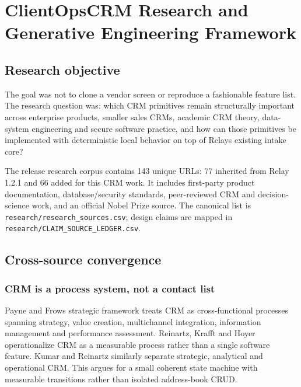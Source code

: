 \documentclass[
]{article}
\author{}
\date{}
\begin{document}
\section{ClientOpsCRM Research and Generative Engineering
Framework}\label{clientopscrm-research-and-generative-engineering-framework}

\subsection{Research objective}\label{research-objective}

The goal was not to clone a vendor screen or reproduce a fashionable
feature list. The research question was: which CRM primitives remain
structurally important across enterprise products, smaller sales CRMs,
academic CRM theory, data-system engineering and secure software
practice, and how can those primitives be implemented with deterministic
local behavior on top of Relay\textquotesingle s existing intake core?

The release research corpus contains 143 unique URLs: 77 inherited from
Relay 1.2.1 and 66 added for this CRM work. It includes first-party
product documentation, database/security standards, peer-reviewed CRM
and decision-science work, and an official Nobel Prize source. The
canonical list is \texttt{research/research\_sources.csv}; design claims
are mapped in \texttt{research/CLAIM\_SOURCE\_LEDGER.csv}.

\subsection{Cross-source convergence}\label{cross-source-convergence}

\subsubsection{CRM is a process system, not a contact
list}\label{crm-is-a-process-system-not-a-contact-list}

Payne and Frow\textquotesingle s strategic framework treats CRM as
cross-functional processes spanning strategy, value creation,
multichannel integration, information management and performance
assessment. Reinartz, Krafft and Hoyer operationalize CRM as a
measurable process rather than a single software feature. Kumar and
Reinartz similarly separate strategic, analytical and operational CRM.
This argues for a small coherent state machine with measurable
transitions rather than isolated address-book CRUD.
\end{document}
